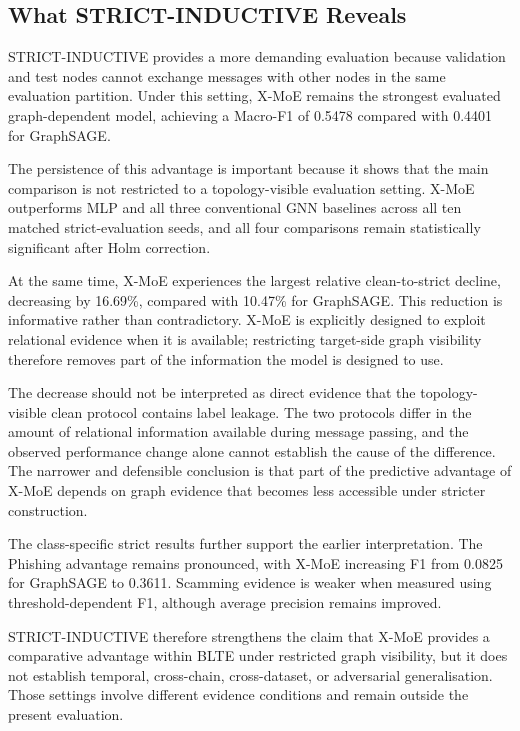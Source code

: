 \documentclass{ieeeaccess}
\begin{document}
\subsection{What STRICT-INDUCTIVE Reveals}

STRICT-INDUCTIVE provides a more demanding evaluation because validation and test nodes cannot exchange messages with other nodes in the same evaluation partition. Under this setting, X-MoE remains the strongest evaluated graph-dependent model, achieving a Macro-F1 of 0.5478 compared with 0.4401 for GraphSAGE.

The persistence of this advantage is important because it shows that the main comparison is not restricted to a topology-visible evaluation setting. X-MoE outperforms MLP and all three conventional GNN baselines across all ten matched strict-evaluation seeds, and all four comparisons remain statistically significant after Holm correction.

At the same time, X-MoE experiences the largest relative clean-to-strict decline, decreasing by 16.69\%, compared with 10.47\% for GraphSAGE. This reduction is informative rather than contradictory. X-MoE is explicitly designed to exploit relational evidence when it is available; restricting target-side graph visibility therefore removes part of the information the model is designed to use.

The decrease should not be interpreted as direct evidence that the topology-visible clean protocol contains label leakage. The two protocols differ in the amount of relational information available during message passing, and the observed performance change alone cannot establish the cause of the difference. The narrower and defensible conclusion is that part of the predictive advantage of X-MoE depends on graph evidence that becomes less accessible under stricter construction.

The class-specific strict results further support the earlier interpretation. The Phishing advantage remains pronounced, with X-MoE increasing F1 from 0.0825 for GraphSAGE to 0.3611. Scamming evidence is weaker when measured using threshold-dependent F1, although average precision remains improved.

STRICT-INDUCTIVE therefore strengthens the claim that X-MoE provides a comparative advantage within BLTE under restricted graph visibility, but it does not establish temporal, cross-chain, cross-dataset, or adversarial generalisation. Those settings involve different evidence conditions and remain outside the present evaluation.
\end{document}
